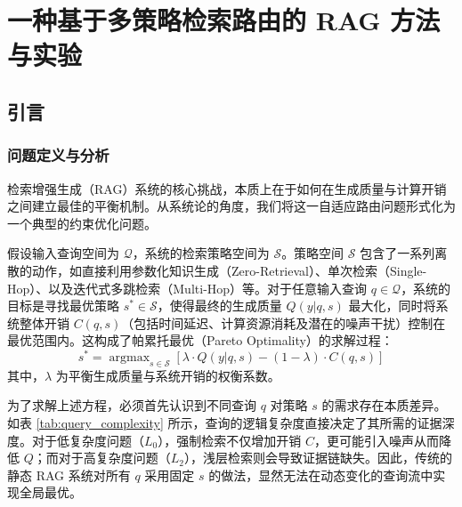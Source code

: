 \renewcommand{\algorithmcfname}{方法}

\chapter{一种基于多策略检索路由的 RAG 方法与实验}\label{chap03}

\section{引言}\label{chap03:intro}

\subsection{问题定义与分析}\label{chap03:problem_def}

检索增强生成（RAG）系统的核心挑战，本质上在于如何在生成质量与计算开销之间建立最佳的平衡机制。从系统论的角度，我们将这一自适应路由问题形式化为一个典型的约束优化问题。

假设输入查询空间为 $\mathcal{Q}$，系统的检索策略空间为 $\mathcal{S}$。策略空间 $\mathcal{S}$ 包含了一系列离散的动作，如直接利用参数化知识生成（Zero-Retrieval）、单次检索（Single-Hop）、以及迭代式多跳检索（Multi-Hop）等。对于任意输入查询 $q \in \mathcal{Q}$，系统的目标是寻找最优策略 $s^* \in \mathcal{S}$，使得最终的生成质量 $Q(y|q, s)$ 最大化，同时将系统整体开销 $C(q, s)$（包括时间延迟、计算资源消耗及潜在的噪声干扰）控制在最优范围内。这构成了帕累托最优（Pareto Optimality）的求解过程：
\begin{equation}
s^* = \mathop{\arg\max}_{s \in \mathcal{S}} \left[ \lambda \cdot Q(y|q, s) - (1-\lambda) \cdot C(q, s) \right]
\end{equation}
其中，$\lambda$ 为平衡生成质量与系统开销的权衡系数。

为了求解上述方程，必须首先认识到不同查询 $q$ 对策略 $s$ 的需求存在本质差异。如表 \ref{tab:query_complexity} 所示，查询的逻辑复杂度直接决定了其所需的证据深度。对于低复杂度问题（$L_0$），强制检索不仅增加开销 $C$，更可能引入噪声从而降低 $Q$；而对于高复杂度问题（$L_2$），浅层检索则会导致证据链缺失。因此，传统的静态 RAG 系统对所有 $q$ 采用固定 $s$ 的做法，显然无法在动态变化的查询流中实现全局最优。

